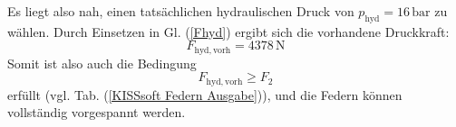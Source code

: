 \noindent
Es liegt also nah, einen tatsächlichen hydraulischen Druck von $p_\mathrm{hyd} = 16\,\mathrm{bar}$ zu wählen.
Durch Einsetzen in Gl. (\ref{Fhyd}) ergibt sich die vorhandene Druckkraft:
\begin{equation}
    F_\mathrm{hyd,vorh} = 4378\,\mathrm{N}
\end{equation}
Somit ist also auch die Bedingung 
\begin{equation*}
    F_\mathrm{hyd,vorh} \geq F_2
\end{equation*}
erfüllt (vgl. Tab. (\ref{KISSsoft Federn Ausgabe})), und die Federn können vollständig vorgespannt werden. 